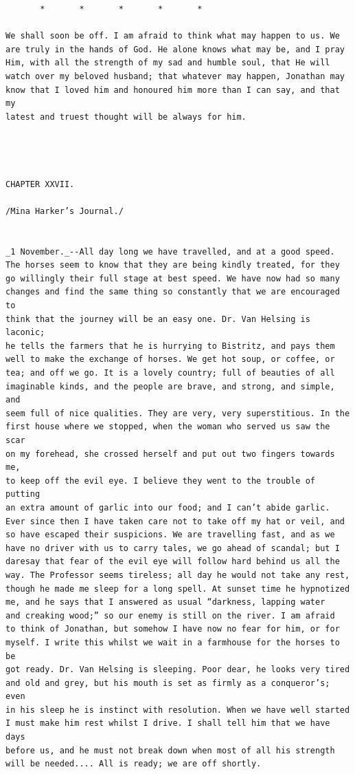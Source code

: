 \documentclass{article}
\begin{document}
\begin{verbatim}
       *       *       *       *       *

We shall soon be off. I am afraid to think what may happen to us. We
are truly in the hands of God. He alone knows what may be, and I pray
Him, with all the strength of my sad and humble soul, that He will
watch over my beloved husband; that whatever may happen, Jonathan may
know that I loved him and honoured him more than I can say, and that my
latest and truest thought will be always for him.




CHAPTER XXVII.

/Mina Harker’s Journal./


_1 November._--All day long we have travelled, and at a good speed.
The horses seem to know that they are being kindly treated, for they
go willingly their full stage at best speed. We have now had so many
changes and find the same thing so constantly that we are encouraged to
think that the journey will be an easy one. Dr. Van Helsing is laconic;
he tells the farmers that he is hurrying to Bistritz, and pays them
well to make the exchange of horses. We get hot soup, or coffee, or
tea; and off we go. It is a lovely country; full of beauties of all
imaginable kinds, and the people are brave, and strong, and simple, and
seem full of nice qualities. They are very, very superstitious. In the
first house where we stopped, when the woman who served us saw the scar
on my forehead, she crossed herself and put out two fingers towards me,
to keep off the evil eye. I believe they went to the trouble of putting
an extra amount of garlic into our food; and I can’t abide garlic.
Ever since then I have taken care not to take off my hat or veil, and
so have escaped their suspicions. We are travelling fast, and as we
have no driver with us to carry tales, we go ahead of scandal; but I
daresay that fear of the evil eye will follow hard behind us all the
way. The Professor seems tireless; all day he would not take any rest,
though he made me sleep for a long spell. At sunset time he hypnotized
me, and he says that I answered as usual “darkness, lapping water
and creaking wood;” so our enemy is still on the river. I am afraid
to think of Jonathan, but somehow I have now no fear for him, or for
myself. I write this whilst we wait in a farmhouse for the horses to be
got ready. Dr. Van Helsing is sleeping. Poor dear, he looks very tired
and old and grey, but his mouth is set as firmly as a conqueror’s; even
in his sleep he is instinct with resolution. When we have well started
I must make him rest whilst I drive. I shall tell him that we have days
before us, and he must not break down when most of all his strength
will be needed.... All is ready; we are off shortly.


\end{verbatim}
\end{document}
